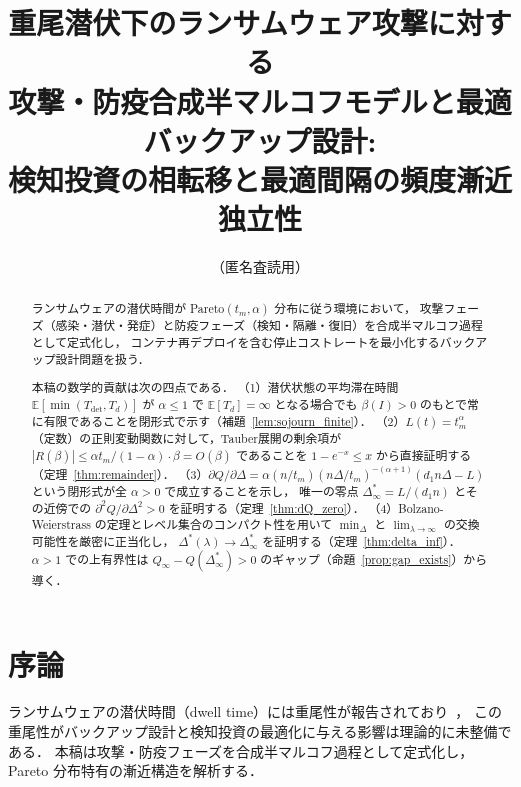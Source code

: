 \documentclass[12pt,a4paper]{article}
\theoremstyle{plain}
\theoremstyle{definition}
\theoremstyle{remark}
\newcommand{\E}{\mathbb{E}}
\newcommand{\Tdet}{T_{\mathrm{det}}}
\newcommand{\betaI}{\beta(I)}
\newcommand{\Dopt}{\Delta^{*}}
\newcommand{\Dinf}{\Delta^{*}_{\infty}}
\begin{document}
\title{重尾潜伏下のランサムウェア攻撃に対する\\
攻撃・防疫合成半マルコフモデルと最適バックアップ設計:\\
検知投資の相転移と最適間隔の頻度漸近独立性}
\author{（匿名査読用）}
\date{}
\maketitle

\begin{abstract}
ランサムウェアの潜伏時間が Pareto$(t_m,\alpha)$ 分布に従う環境において，
攻撃フェーズ（感染・潜伏・発症）と防疫フェーズ（検知・隔離・復旧）を合成半マルコフ過程として定式化し，
コンテナ再デプロイを含む停止コストレートを最小化するバックアップ設計問題を扱う．

本稿の数学的貢献は次の四点である．
（1）潜伏状態の平均滞在時間 $\E[\min(\Tdet,T_d)]$ が
$\alpha\le1$ で $\E[T_d]=\infty$ となる場合でも
$\betaI>0$ のもとで常に有限であることを閉形式で示す（補題~\ref{lem:sojourn_finite}）．
（2）$L(t)=t_m^\alpha$（定数）の正則変動関数に対して，Tauber展開の剰余項が
$|R(\beta)|\le\alpha t_m/(1-\alpha)\cdot\beta=O(\beta)$ であることを
$1-e^{-x}\le x$ から直接証明する（定理~\ref{thm:remainder}）．
（3）$\partial Q/\partial\Delta = \alpha(n/t_m)(n\Delta/t_m)^{-(\alpha+1)}(d_1n\Delta-L)$
という閉形式が全 $\alpha>0$ で成立することを示し，
唯一の零点 $\Dinf=L/(d_1n)$ とその近傍での $\partial^2Q/\partial\Delta^2>0$ を証明する（定理~\ref{thm:dQ_zero}）．
（4）Bolzano-Weierstrass の定理とレベル集合のコンパクト性を用いて
$\min_\Delta$ と $\lim_{\lambda\to\infty}$ の交換可能性を厳密に正当化し，
$\Dopt(\lambda)\to\Dinf$ を証明する（定理~\ref{thm:delta_inf}）．
$\alpha>1$ での上有界性は $Q_\infty-Q(\Dinf)>0$ のギャップ（命題~\ref{prop:gap_exists}）から導く．
\end{abstract}

\tableofcontents
\newpage

\section{序論}
\label{sec:intro}

ランサムウェアの潜伏時間（dwell time）には重尾性が報告されており~\cite{mandiant2023,ibm2023,gruber2022}，
この重尾性がバックアップ設計と検知投資の最適化に与える影響は理論的に未整備である．
本稿は攻撃・防疫フェーズを合成半マルコフ過程として定式化し，
Pareto 分布特有の漸近構造を解析する．
\end{document}
